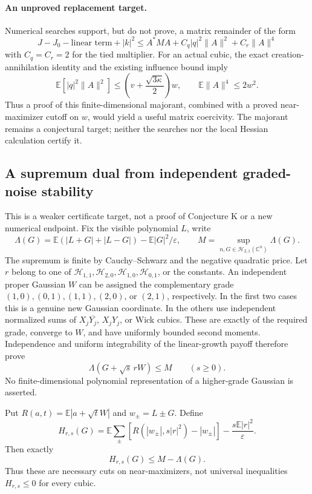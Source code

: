 \paragraph{An unproved replacement target.}
Numerical searches support, but do not prove, a matrix remainder of the
form
\[
 J-J_0-\text{linear term}+|k|^2
 \le A^*MA+C_q|q|^2\|A\|^2+C_r\|A\|^4
\]
with $C_q=C_r=2$ for the tied multiplier. For an actual cubic, the exact
creation-annihilation identity and the existing influence bound imply
\[
 \mathbb E[|q|^2\|A\|^2]
 \le\left(v+\frac{\sqrt{3\kappa}}2\right)w,
 \qquad \mathbb E\|A\|^4\le2w^2.
\]
Thus a proof of this finite-dimensional majorant, combined with a
proved near-maximizer cutoff on $w$, would yield a useful matrix
coercivity. The majorant remains a conjectural target; neither the
searches nor the local Hessian calculation certify it.


\subsection{A supremum dual from independent graded-noise stability}
\label{sec:noise-stable-weak-K}

This is a weaker certificate target, not a proof of Conjecture K or a new
numerical endpoint. Fix the visible polynomial $L$, write
\[
 \Lambda(G)=\mathbb E(|L+G|+|L-G|)-\mathbb E|G|^2/\varepsilon,
 \qquad M=\sup_{n,G\in\mathcal H_{2,1}(\mathbb C^n)}\Lambda(G).
\]
The supremum is finite by Cauchy--Schwarz and the negative quadratic price.
Let $r$ belong to one of
$\mathcal H_{1,1},\mathcal H_{2,0},\mathcal H_{1,0},\mathcal H_{0,1}$,
or the constants. An independent proper Gaussian $W$ can be assigned the
complementary grade $(1,0),(0,1),(1,1),(2,0)$, or $(2,1)$, respectively.
In the first two cases this is a genuine new Gaussian coordinate. In the
others use independent normalized sums of $X_j\overline{Y_j}$, $X_jY_j$,
or Wick cubics. These are exactly of the required grade, converge to $W$,
and have uniformly bounded second moments. Independence and uniform
integrability of the linear-growth payoff therefore prove
\[
 \Lambda(G+\sqrt{s}\,rW)\le M\qquad(s\ge0).
\]
No finite-dimensional polynomial representation of a higher-grade
Gaussian is asserted.

Put $R(a,t)=\mathbb E|a+\sqrt tW|$ and $w_\pm=L\pm G$. Define
\[
 H_{r,s}(G)=\mathbb E\sum_{\pm}
 [R(|w_\pm|,s|r|^2)-|w_\pm|]
 -\frac{s\mathbb E|r|^2}{\varepsilon}.
\]
Then exactly
\begin{equation}\label{eq:noise-near-max}
 H_{r,s}(G)\le M-\Lambda(G).
\end{equation}
Thus these are necessary cuts on near-maximizers, not universal
inequalities $H_{r,s}\le0$ for every cubic.

